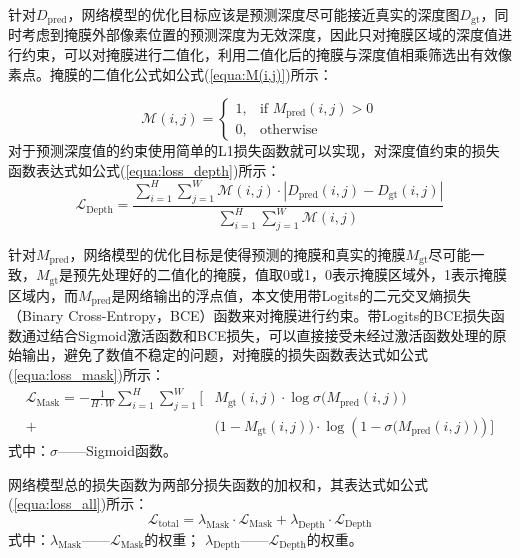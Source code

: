 针对$D_{\text{pred}}$，网络模型的优化目标应该是预测深度尽可能接近真实的深度图$D_{\text{gt}}$，同时考虑到掩膜外部像素位置的预测深度为无效深度，因此只对掩膜区域的深度值进行约束，可以对掩膜进行二值化，利用二值化后的掩膜与深度值相乘筛选出有效像素点。掩膜的二值化公式如公式(\ref{equa:M(i,j)})所示：

\begin{equation}
    \label{equa:M(i,j)}
    \mathcal{M}(i,j) = 
    \begin{cases} 
    1, & \text{if  } M_{\text{pred}}(i,j) > 0 \\
    0, & \text{otherwise}
    \end{cases}
\end{equation}
对于预测深度值的约束使用简单的L1损失函数就可以实现，对深度值约束的损失函数表达式如公式(\ref{equa:loss_depth})所示：
\begin{equation}
    \label{equa:loss_depth}
    \mathcal{L}_{\text{Depth}} = \frac{ 
    \sum_{i=1}^{H} \sum_{j=1}^{W} 
    \mathcal{M}(i,j) \cdot 
    \left| D_{\text{pred}}(i,j) - D_{\text{gt}}(i,j) \right|
    }{ 
    \sum_{i=1}^{H} \sum_{j=1}^{W} \mathcal{M}(i,j) 
    }
\end{equation}

针对$M_{\text{pred}}$，网络模型的优化目标是使得预测的掩膜和真实的掩膜$M_{\text{gt}}$尽可能一致，$M_{\text{gt}}$是预先处理好的二值化的掩膜，值取0或1，0表示掩膜区域外，1表示掩膜区域内，而$M_{\text{pred}}$是网络输出的浮点值，本文使用带Logits的二元交叉熵损失（Binary Cross-Entropy，BCE）函数来对掩膜进行约束。带Logits的BCE损失函数通过结合Sigmoid激活函数和BCE损失，可以直接接受未经过激活函数处理的原始输出，避免了数值不稳定的问题，对掩膜的损失函数表达式如公式(\ref{equa:loss_mask})所示：
\begin{equation}
    \label{equa:loss_mask}
    \begin{aligned}
    \mathcal{L}_{\text{Mask}} = -\frac{1}{H \cdot W} \sum_{i=1}^{H} \sum_{j=1}^{W} \Bigg[ 
    & M_{\text{gt}}(i,j) \cdot \log \sigma\big(M_{\text{pred}}(i,j)\big) \\
    + & \big(1 - M_{\text{gt}}(i,j)\big) \cdot \log \left(1 - \sigma\big(M_{\text{pred}}(i,j)\big)\right) 
    \Bigg]
    \end{aligned}
\end{equation}
式中：$\sigma$——Sigmoid函数。


网络模型总的损失函数为两部分损失函数的加权和，其表达式如公式(\ref{equa:loss_all})所示：
\begin{equation}
    \label{equa:loss_all}
\mathcal{L}_{\text{total}} = 
  \lambda_{\text{Mask}} \cdot \mathcal{L}_{\text{Mask}}
+ 
  \lambda_{\text{Depth}} \cdot \mathcal{L}_{\text{Depth}}
\end{equation}
式中：$\lambda_{\text{Mask}}$——$\mathcal{L}_{\text{Mask}}$的权重； $\lambda_{\text{Depth}}$——$\mathcal{L}_{\text{Depth}}$的权重。

